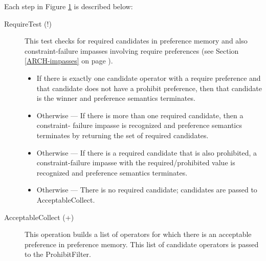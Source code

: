 
\begin{figure}
	\label{fig:prefsem}
\end{figure}

Each step in Figure \ref{fig:prefsem} is described below:

\begin{description}
	\item[RequireTest (!)]
	This test checks for required candidates in preference memory and
	also constraint-failure impasses involving require preferences (see
	Section \ref{ARCH-impasses} on page \pageref{ARCH-impasses}).
	
	\begin{itemize}
		\item If there is exactly one candidate operator with a require preference and
		that candidate does not have a prohibit preference, then that candidate
		is the winner and preference semantics terminates.
		\item Otherwise ---
		If there is more than one required candidate, then a constraint-
		failure impasse is recognized and preference semantics terminates 
		by returning the set of required candidates.
		\item Otherwise ---
		If there is a required candidate that is also prohibited, a
		constraint-failure impasse with the required/prohibited value is
		recognized and preference semantics terminates.
		\item Otherwise ---
		There is no required candidate; candidates are passed to AcceptableCollect.
	\end{itemize}
	
	\item[AcceptableCollect (+) ] This operation builds a list of operators
	for which there is an acceptable preference in preference memory.
	This list of candidate operators is passed to the ProhibitFilter.\index{+}
	

\end{description}
